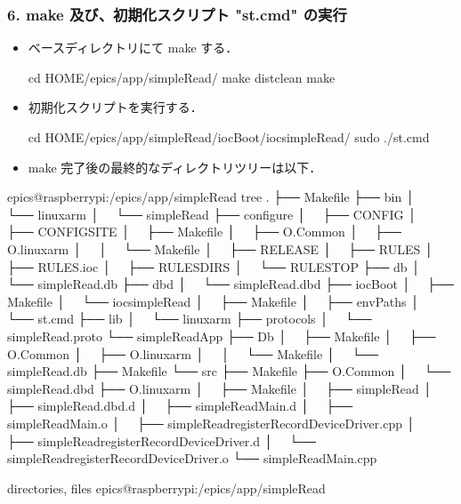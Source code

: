 \documentclass[letterpaper,10pt,dvipdfmx]{sphinxmanual}
\begin{document}
\subsubsection{6. make 及び、初期化スクリプト "st.cmd" の実行}
\label{\detokenize{epics/rst/example2__arduino_ADConvertor:make-st-cmd}}\begin{itemize}
\item {} 
ベースディレクトリにて make する．

\begin{sphinxVerbatim}[commandchars=\\\{\}]
\PYGZdl{} cd \PYGZdl{}HOME/epics/app/simpleRead/
\PYGZdl{} make distclean
\PYGZdl{} make
\end{sphinxVerbatim}

\item {} 
初期化スクリプトを実行する．

\begin{sphinxVerbatim}[commandchars=\\\{\}]
\PYGZdl{} cd \PYGZdl{}HOME/epics/app/simpleRead/iocBoot/iocsimpleRead/
\PYGZdl{} sudo ./st.cmd
\end{sphinxVerbatim}

\item {} 
make 完了後の最終的なディレクトリツリーは以下．

\end{itemize}
\def\sphinxLiteralBlockLabel{\label{\detokenize{epics/rst/example2__arduino_ADConvertor:id10}}}
\begin{sphinxVerbatim}[commandchars=\\\{\}]
epics@raspberrypi:\PYGZti{}/epics/app/simpleRead \PYGZdl{} tree
.
├── Makefile
├── bin
│   └── linux\PYGZhy{}arm
│       └── simpleRead
├── configure
│   ├── CONFIG
│   ├── CONFIG\PYGZus{}SITE
│   ├── Makefile
│   ├── O.Common
│   ├── O.linux\PYGZhy{}arm
│   │   └── Makefile
│   ├── RELEASE
│   ├── RULES
│   ├── RULES.ioc
│   ├── RULES\PYGZus{}DIRS
│   └── RULES\PYGZus{}TOP
├── db
│   └── simpleRead.db
├── dbd
│   └── simpleRead.dbd
├── iocBoot
│   ├── Makefile
│   └── iocsimpleRead
│       ├── Makefile
│       ├── envPaths
│       └── st.cmd
├── lib
│   └── linux\PYGZhy{}arm
├── protocols
│   └── simpleRead.proto
└── simpleReadApp
    ├── Db
    │   ├── Makefile
    │   ├── O.Common
    │   ├── O.linux\PYGZhy{}arm
    │   │   └── Makefile
    │   └── simpleRead.db
    ├── Makefile
    └── src
        ├── Makefile
        ├── O.Common
        │   └── simpleRead.dbd
        ├── O.linux\PYGZhy{}arm
        │   ├── Makefile
        │   ├── simpleRead
        │   ├── simpleRead.dbd.d
        │   ├── simpleReadMain.d
        │   ├── simpleReadMain.o
        │   ├── simpleRead\PYGZus{}registerRecordDeviceDriver.cpp
        │   ├── simpleRead\PYGZus{}registerRecordDeviceDriver.d
        │   └── simpleRead\PYGZus{}registerRecordDeviceDriver.o
        └── simpleReadMain.cpp

 directories,  files
epics@raspberrypi:\PYGZti{}/epics/app/simpleRead \PYGZdl{} 
\end{sphinxVerbatim}
\end{document}
